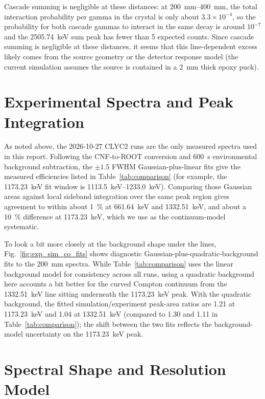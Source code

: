\documentclass[11pt,a4paper]{article}
\begin{document}
Cascade summing is negligible at these distances: at \SI{200}{mm}--\SI{400}{mm}, the total interaction probability per gamma in the crystal is only about $3.3\times10^{-4}$, so the probability for both cascade gammas to interact in the same decay is around $10^{-7}$ and the \SI{2505.74}{keV} sum peak has fewer than 5 expected counts. Since cascade summing is negligible at these distances, it seems that this line-dependent excess likely comes from the  source geometry or the detector response model (the current simulation assumes the source is contained in a \SI{2}{\milli\meter} thick epoxy puck).

\section{Experimental Spectra and Peak Integration}
\label{sec:peak_integration}

As noted above, the 2026-10-27 CLYC2 runs are the only measured spectra used in this report. Following the CNF-to-ROOT conversion and \SI{600}{s} environmental background subtraction, the $\pm1.5$ FWHM Gaussian-plus-linear fits give the measured efficiencies listed in Table~\ref{tab:comparison} (for example, the \SI{1173.23}{keV} fit window is \SI{1113.5}{keV}--\SI{1233.0}{keV}). Comparing those Gaussian areas against local sideband integration over the same peak region gives agreement to within about \SI{1}{\percent} at \SI{661.64}{keV} and \SI{1332.51}{keV}, and about a \SI{10}{\percent} difference at \SI{1173.23}{keV}, which we use as the continuum-model systematic.

To look a bit more closely at the background shape under the  lines, Fig.~\ref{fig:exp_sim_co_fits} shows diagnostic Gaussian-plus-quadratic-background fits to the \SI{200}{mm}  spectra. While Table~\ref{tab:comparison} uses the linear background model for consistency across all runs, using a quadratic background here accounts a bit better for the curved Compton continuum from the \SI{1332.51}{keV} line sitting underneath the \SI{1173.23}{keV} peak. With the quadratic background, the fitted simulation/experiment peak-area ratios are 1.21 at \SI{1173.23}{keV} and 1.04 at \SI{1332.51}{keV} (compared to 1.30 and 1.11 in Table~\ref{tab:comparison}); the shift between the two fits reflects the background-model uncertainty on the \SI{1173.23}{keV} peak.

\section{Spectral Shape and Resolution Model}
\label{sec:resolution}
\end{document}
